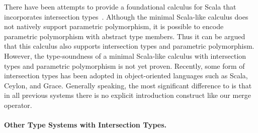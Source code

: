 There have been attempts to provide a foundational calculus
for Scala that incorporates intersection
types~\cite{amin2014foundations,amin2012dependent}.
Although the minimal Scala-like calculus does not natively support
parametric polymorphism, it is possible to encode parametric
polymorphism with abstract type members. Thus it can be argued that
this calculus also supports intersection types and parametric
polymorphism. However, the type-soundness of a minimal Scala-like
calculus with intersection types and parametric polymorphism is not
yet proven. Recently, some form of intersection
types has been adopted in object-oriented languages such as Scala,
Ceylon, and Grace. Generally speaking,
the most significant difference to \name is that in all previous systems
there is no explicit introduction construct like our merge operator.

\begin{comment}
only allow intersections of concrete types (classes),
whereas our language allows intersections of type variables, such as
\texttt{A \& B}. Without that vehicle, we would not be able to define
the generic \texttt{merge} function (below) for all interpretations of
a given algebra, and would incur boilerplate code:

\begin{lstlisting}
let merge [A, B] (f: ExpAlg A) (g: ExpAlg B) = {
  lit (x : Int) = f.lit x ,, g.lit x,
  add (x : A & B) (y : A & B) =
    f.add x y ,, g.add x y
}
\end{lstlisting}
\end{comment}

\paragraph{Other Type Systems with Intersection Types.}

